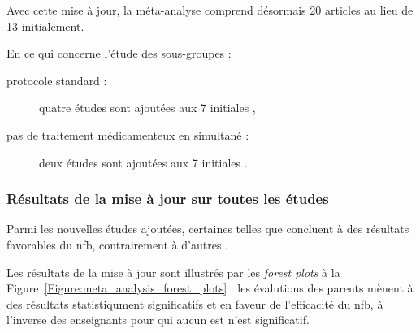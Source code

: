 Avec cette mise à jour, la méta-analyse comprend désormais 20 articles au lieu de 13 initialement.

En ce qui concerne l'étude des sous-groupes :
\begin{description}
\item[protocole standard :] quatre études sont ajoutées \citep{Strehl2017, Baumeister2016, Aggensteiner2019, Minder2018} aux 7 initiales \citep{Bakhshayesh2011,
Christiansen2014, Gevensleben2009, Beauregard2006, Holtmann2009, Heinrich2004, Linden1996},
\item[pas de traitement médicamenteux en simultané :] deux études sont ajoutées \citep{Bazanova2018, Moreno2019} aux 7 initiales \citep{Beauregard2006, 
Gevensleben2009, Bakhshayesh2011, Arnold2014, Linden1996, Christiansen2014, Maurizio2014}.
\end{description}

\subsubsection{Résultats de la mise à jour sur toutes les études}

Parmi les nouvelles études ajoutées, certaines telles que \citet{Shereena2019, Strehl2017} concluent à des résultats favorables du \gls{nfb},
contrairement à d'autres \citep{Moreno2019, Minder2018}.

Les résultats de la mise à jour sont illustrés par les \textit{forest plots} à la Figure~\ref{Figure:meta_analysis_forest_plots} : les évalutions
des parents mènent à des résultats statistiqument significatifs et en faveur de l'efficacité du \gls{nfb}, à l'inverse des enseignants pour qui
aucun \gls{est} n'est significatif.

